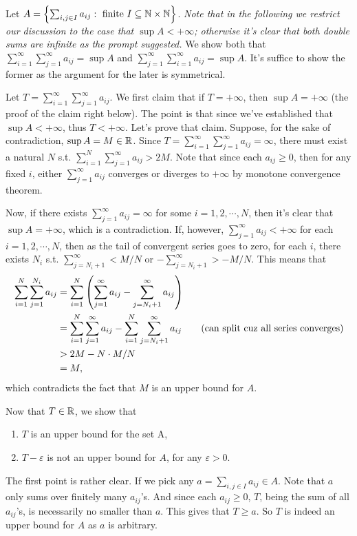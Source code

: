 \documentclass[12pt]{article}
\begin{document}
\begin{fproof}[3(b)]
 Let \(A = \left\{ \sum_{i,j \in I} a_{ij} : \text{ finite } I \subseteq \mathbb {N} \times \mathbb {N} \right\}\).
 \textit{Note that in the following we restrict our discussion to the case that \(\sup A < +\infty\); otherwise it's clear that both double sums are infinite as the prompt suggested.}
 We show both that \(\sum_{i=1}^{\infty} \sum_{j=1}^{\infty} a_{ij} = \sup A\) and \(\sum_{j=1}^{\infty} \sum_{i=1}^{\infty} a_{ij} = \sup A\). It's suffice to show the former as the argument for the later is symmetrical.

 Let \(T = \sum_{i=1}^{\infty} \sum_{j=1}^{\infty} a_{ij}\).
 We first claim that if \(T = +\infty\), then \(\sup A = +\infty\) (the proof of the claim right below). The point is that since we've established that \(\sup A < +\infty\), thus \(T < +\infty\).
 Let's prove that claim. 
 Suppose, for the sake of contradiction, \(\sup A = M \in \mathbb {R}\).
 Since \(T = \sum_{i=1}^{\infty} \sum_{j=1}^{\infty} a_{ij} = \infty\), there must exist a natural \(N\) s.t. \(\sum_{i=1}^{N} \sum_{j=1}^{\infty} a_{ij} > 2M\).
 Note that since each \(a_{ij} \geq 0\), then for any fixed \(i\), either \(\sum_{j=1}^{\infty} a_{ij}\) converges or diverges to \(+\infty\) by monotone convergence theorem.

 Now, if there exists \(\sum_{j=1}^{\infty} a_{ij} = \infty\) for some \(i = 1, 2, \cdots, N\), then it's clear that \(\sup A = +\infty\), which is a contradiction.
 If, however, \(\sum_{j=1}^{\infty} a_{ij} < +\infty\) for each \(i = 1, 2, \cdots, N\), then as the tail of convergent series goes to zero, for each \(i\), there exists \(N_i\) s.t. \(\sum_{j=N_i + 1}^{\infty} < M/N\) or \(-\sum_{j=N_i + 1}^{\infty} > -M/N\).
 This means that
 \begin{align*}
    \sum_{i=1}^{N} \sum_{j=1}^{N_i} a_{ij}
    &= \sum_{i=1}^{N} \left( \sum_{j=1}^{\infty} a_{ij} - \sum_{j=N_i+1}^{\infty} a_{ij} \right) \\
    &= \sum_{i=1}^{N}\sum_{j=1}^{\infty} a_{ij}- \sum_{i=1}^{N}\sum_{j=N_i+1}^{\infty} a_{ij} \tag{can split cuz all series converges} \\
    &>  2M - N \cdot M/N \\
    &= M,
 \end{align*}
 which contradicts the fact that \(M\) is an upper bound for \(A\).

 Now that \(T \in \mathbb {R}\), we show that
 \begin{enumerate}
    \item \(T\) is an upper bound for the set A,
    \item \(T - \varepsilon\) is not an upper bound for \(A\), for any \(\varepsilon > 0\).
 \end{enumerate}
 The first point is rather clear. 
 If we pick any \(a = \sum_{i,j \in I} a_{ij} \in A\).
 Note that \(a\) only sums over finitely many \(a_{ij}\)'s. 
 And since each \(a_{ij} \geq 0\), \(T\), being the sum of all \(a_{ij}\)'s, is necessarily no smaller than \(a\).
 This gives that \(T \geq a\).
 So \(T\) is indeed an upper bound for \(A\) as \(a\) is arbitrary.


\end{fproof}
\end{document}
